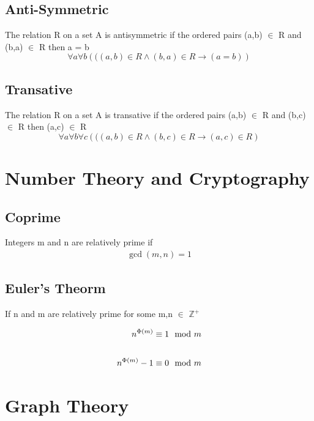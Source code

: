 \documentclass[12pt]{article}
\begin{document}
\subsection{Anti-Symmetric}
The relation R on a set A is antisymmetric 
if the ordered pairs (a,b) $\in$ R 
and (b,a) $\in$ R 
then a = b
\begin{equation}
\forall a \forall b \left(( (a,b)\in R \wedge (b,a)\in R \rightarrow (a = b) \right)
\end{equation}

\subsection{Transative}
The relation R on a set A is transative 
if the ordered pairs (a,b) $\in$ R 
and (b,c) $\in$ R 
then (a,c) $\in$ R
\begin{equation}
\forall a \forall b \forall c \left(( (a,b)\in R \wedge (b,c)\in R \rightarrow (a,c) \in R \right)
\end{equation}

%
%
%
%
%
%
\pagebreak
\section{Number Theory and Cryptography}
\setcounter{equation}{0}


\subsection{Coprime}
Integers m and n are relatively prime if 
\begin{align}
\gcd (m,n) = 1
\end{align}

\subsection{Euler's Theorm}
If 
n
and
m
are
relatively
prime 
for
some
m,n $\in$ $\mathbb{Z}^+$

\begin{subequations}
\begin{align}
n^{\Phi(m)}\equiv 1\mod{m}\\
\intertext{ }
n^{\Phi(m)} - 1\equiv 0\mod{m}
\end{align}
\end{subequations}

%
%
%
%
%
%
\pagebreak
\section{Graph Theory}
\setcounter{equation}{0}
\end{document}
